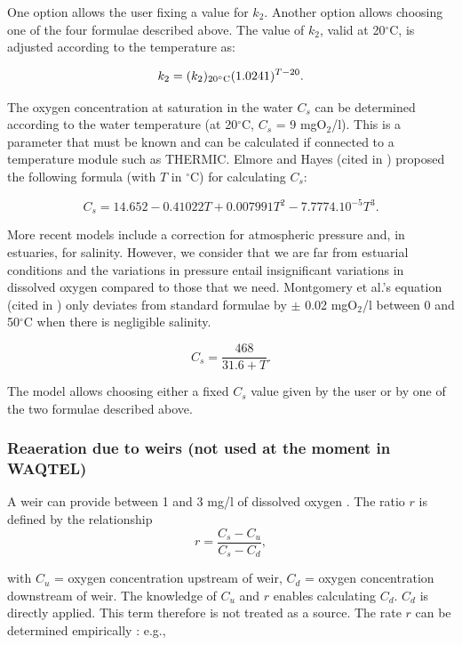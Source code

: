 One option allows the user fixing a value for $k_2$.
Another option allows choosing one of the four formulae described above.
The value of $k_2$, valid at 20$^{\circ}$C, is adjusted according to the temperature as:

\begin{equation}
  k_2 = (k_2)_{20^{\circ}\rm{C}} (1.0241)^{T-20}.
\end{equation}

The oxygen concentration at saturation in the water $C_s$ can be determined
according to the water temperature (at 20$^{\circ}$C, $C_s$ = 9 mgO$_2$/l).
This is a parameter that must be known and can be calculated
if connected to a temperature module such as THERMIC.
Elmore and Hayes (cited in \cite{mccutcheon_wq_1989}) proposed the following formula
(with $T$ in $^{\circ}$C) for calculating $C_s$:

\begin{equation}
  C_s = 14.652 - 0.41022 T + 0.007991 T^2 - 7.7774.10^{-5}T^3.
\end{equation}

More recent models include a correction for atmospheric pressure and, in estuaries, for salinity.
However, we consider that we are far from estuarial conditions and the variations in pressure
entail insignificant variations in dissolved oxygen compared to those that we need.
Montgomery et al.'s equation (cited in \cite{mccutcheon_wq_1989})
only deviates from standard formulae by $ \pm $  0.02 mgO$_2$/l
between 0 and 50$^{\circ}$C when there is negligible salinity.

\begin{equation}
  C_s = \frac{468}{31.6+T}.
\end{equation}

The model allows choosing either a fixed $C_s$ value given
by the user or by one of the two formulae described above.\\

\subsubsection{Reaeration due to weirs (not used at the moment in WAQTEL)}

A weir can provide between 1 and 3 mg/l of dissolved oxygen \cite{mccutcheon_wq_1989}.
The ratio $r$ is defined by the relationship $$r = \frac{C_s-C_u}{C_s-C_d},$$

with $C_u$ = oxygen concentration upstream of weir,
$C_d$ = oxygen concentration downstream of weir.
The knowledge of $C_u$ and $r$  enables calculating $C_d$.
$C_d$ is directly applied.
This term therefore is not treated as a source.
The rate $r$ can be determined empirically
\cite{mccutcheon_wq_1989}: e.g.,

